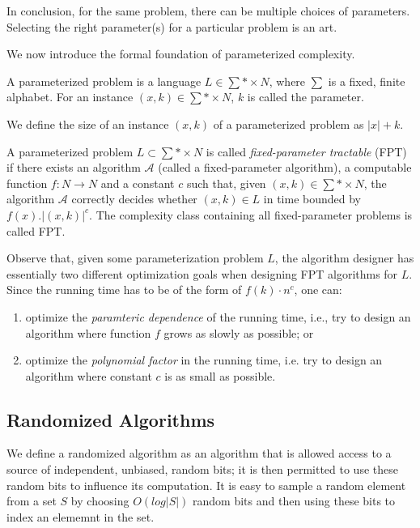In conclusion, for the same problem, there can be multiple choices of parameters. 
Selecting the right parameter(s) for a particular problem is an art.

We now introduce the formal foundation of parameterized complexity.

\begin{definition}
 A parameterized problem is a language $L \in \sum* \times N$, where $\sum$ is a fixed, finite alphabet. For an instance $(x,k) \in \sum* \times N$, $k$ is called the parameter.
\end{definition}

We define the size of an instance $(x,k)$ of a parameterized problem as $|x| + k$. 

\begin{definition}
 A parameterized problem $L \subset \sum* \times N$ is called \textit{fixed-parameter tractable} (FPT) if there exists an algorithm $\mathcal{A}$ (called a fixed-parameter algorithm),
 a computable function $f: N \rightarrow N$ and a constant $c$ such that, given $(x,k) \in \sum* \times N$, the algorithm $\mathcal{A}$ correctly decides
 whether $(x,k) \in L$ in time bounded by $f(x). |(x,k)|^c$.
 The complexity class containing all fixed-parameter problems is called FPT.
\end{definition}


Observe that, given some parameterization problem $L$, the algorithm designer has essentially two different optimization goals when designing FPT algorithms for $L$.
Since the running time has to be of the form of $f(k)\cdot n^c$, one can:

\begin{enumerate}
 \item optimize the \textit{paramteric dependence} of the running time, i.e., try to design an algorithm where function $f$ grows as slowly as possible; or
 \item optimize the \textit{polynomial factor} in the running time, i.e. try to design an algorithm where constant $c$ is as small as possible.
\end{enumerate}

\subsection{Randomized Algorithms}
We define a randomized algorithm as an algorithm that is allowed access to a source of independent, 
unbiased, random bits; it is then permitted to use these random bits to influence its computation.
It is easy to sample a random element from a set $S$ by choosing $O(log |S|)$ random bits and then using these
bits to index an elememnt in the set. 

